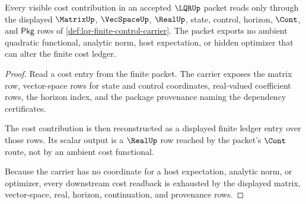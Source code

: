 \begin{theorem}
\label{thm:lqr-quadratic-cost-exactness}
Every visible cost contribution in an accepted $\LQRUp$ packet reads only
through the displayed $\MatrixUp$, $\VecSpaceUp$, $\RealUp$, state, control,
horizon, $\Cont$, and $\mathsf{Pkg}$ rows of
\autoref{def:lqr-finite-control-carrier}. The packet exports no ambient
quadratic functional, analytic norm, host expectation, or hidden optimizer
that can alter the finite cost ledger.
\end{theorem}
\begin{proof}
Read a cost entry from the finite packet. The carrier exposes the matrix row,
vector-space rows for state and control coordinates, real-valued coefficient
rows, the horizon index, and the package provenance naming the dependency
certificates.

The cost contribution is then reconstructed as a displayed finite ledger
entry over those rows. Its scalar output is a $\RealUp$ row reached by the
packet's $\Cont$ route, not by an ambient cost functional.

Because the carrier has no coordinate for a host expectation, analytic norm,
or optimizer, every downstream cost readback is exhausted by the displayed
matrix, vector-space, real, horizon, continuation, and provenance rows.
\end{proof}

